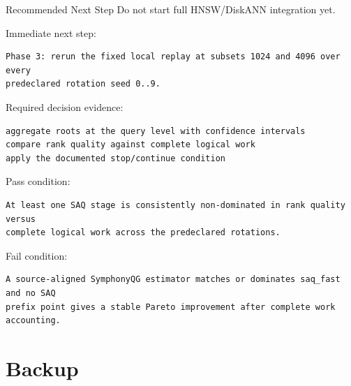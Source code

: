 \documentclass[aspectratio=169,10pt]{beamer}
\begin{document}
\begin{frame}[fragile]{Recommended Next Step}
\small
Do not start full HNSW/DiskANN integration yet.

\vspace{0.6em}
Immediate next step:
\begin{lstlisting}
Phase 3: rerun the fixed local replay at subsets 1024 and 4096 over every
predeclared rotation seed 0..9.
\end{lstlisting}

Required decision evidence:
\begin{lstlisting}
aggregate roots at the query level with confidence intervals
compare rank quality against complete logical work
apply the documented stop/continue condition
\end{lstlisting}

Pass condition:
\begin{lstlisting}
At least one SAQ stage is consistently non-dominated in rank quality versus
complete logical work across the predeclared rotations.
\end{lstlisting}

Fail condition:
\begin{lstlisting}
A source-aligned SymphonyQG estimator matches or dominates saq_fast and no SAQ
prefix point gives a stable Pareto improvement after complete work accounting.
\end{lstlisting}
\end{frame}

\appendix
\section{Backup}
\end{document}
